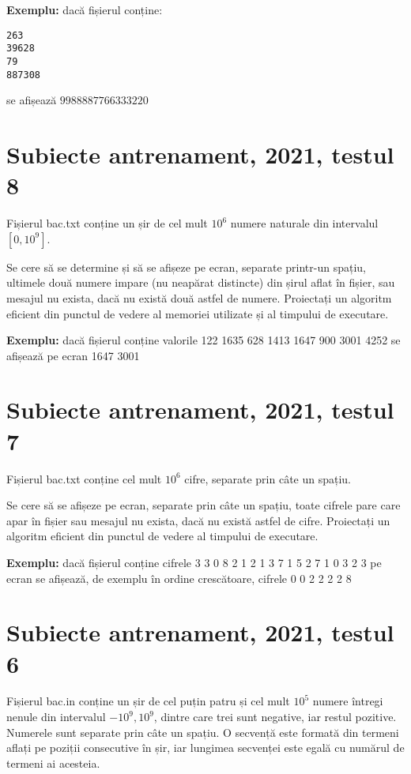 \documentclass[10pt, a4paper]{article}
\newcommand{\highlight}[1]{{\ttfamily\color{red}#1}}
\begin{document}
\vspace{0.2cm}
\noindent \textbf{Exemplu:} dacă fișierul conține:
\begin{verbatim}
263
39628
79
887308
\end{verbatim}
se afișează \highlight{$9988887766333220$}

\section{Subiecte antrenament, 2021, testul 8}
Fișierul bac.txt conține un șir de cel mult \highlight{$10^6$} numere naturale din intervalul \highlight{$[0,10^9]$}.

\vspace{0.2cm}
\noindent Se cere să se determine și să se afișeze pe ecran, separate printr-un spațiu, ultimele două numere impare (nu neapărat distincte) din șirul aflat în fișier, sau mesajul \highlight{nu exista}, dacă nu există două astfel de numere. Proiectați un algoritm eficient din punctul de vedere al memoriei utilizate și al timpului de executare.

\vspace{0.2cm}
\noindent \textbf{Exemplu:} dacă fișierul conține valorile \highlight{122 1635 628 1413 1647 900 3001 4252} se afișează pe ecran \highlight{1647 3001}


\section{Subiecte antrenament, 2021, testul 7}
Fișierul \highlight{bac.txt} conține cel mult \highlight{$10^6$} cifre, separate prin câte un spațiu.

\vspace{0.2cm}
\noindent Se cere să se afișeze pe ecran, separate prin câte un spațiu, toate cifrele pare care apar în fișier sau mesajul \highlight{nu exista}, dacă nu există astfel de cifre. Proiectați un algoritm eficient din punctul de vedere al timpului de executare.

\vspace{0.2cm}
\noindent \textbf{Exemplu:} dacă fișierul conține cifrele \highlight{3 3 0 8 2 1 2 1 3 7 1 5 2 7 1 0 3 2 3} pe ecran se afișează, de exemplu în ordine crescătoare, cifrele \highlight{0 0 2 2 2 2 8}

\section{Subiecte antrenament, 2021, testul 6}
Fișierul \highlight{bac.in} conține un șir de cel puțin patru și cel mult \highlight{$10^5$} numere întregi nenule din intervalul \highlight{$-10^9,10^9$}, dintre care trei sunt negative, iar restul pozitive. Numerele sunt separate prin câte un spațiu. O secvență este formată din termeni aflați pe poziții consecutive în șir, iar lungimea secvenței este egală cu numărul de termeni ai acesteia.
\end{document}
